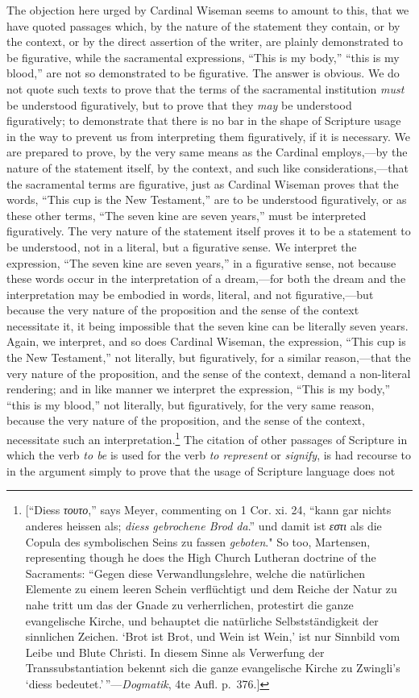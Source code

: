 \documentclass[english,]{book}
\begin{document}
The objection here urged by Cardinal Wiseman seems to amount to this, that we have quoted passages which, by the nature of the statement they contain, or by the context, or by the direct assertion of the writer, are plainly demonstrated to be figurative, while the sacramental expressions, ``This is my body,'' ``this is my blood,'' are not so demonstrated to be figurative. The answer is obvious. We do not quote such texts to prove that the terms of the sacramental institution \emph{must} be understood figuratively, but to prove that they \emph{may} be understood figuratively; to demonstrate that there is no bar in the shape of Scripture usage in the way to prevent us from interpreting them figuratively, if it is necessary. We are prepared to prove, by the very same means as the Cardinal employs,---by the nature of the statement itself, by the context, and such like considerations,---that the sacramental terms are figurative, just as Cardinal Wiseman proves that the words, ``This cup is the New Testament,'' are to be understood figuratively, or as these other terms, ``The seven kine are seven years,'' must be interpreted figuratively. The very nature of the statement itself proves it to be a statement to be understood, not in a literal, but a figurative sense. We interpret the expression, ``The seven kine are seven years,'' in a figurative sense, not because these words occur in the interpretation of a dream,---for both the dream and the interpretation may be embodied in words, literal, and not figurative,---but because the very nature of the proposition and the sense of the context necessitate it, it being impossible that the seven kine can be literally seven years. Again, we interpret, and so does Cardinal Wiseman, the expression, ``This cup is the New Testament,'' not literally, but figuratively, for a similar reason,---that the very nature of the proposition, and the sense of the context, demand a non-literal rendering; and in like manner we interpret the expression, ``This is my body,'' ``this is my blood,'' not literally, but figuratively, for the very same reason, because the very nature of the proposition, and the sense of the context, necessitate such an interpretation.\footnote{{[}``Diess \emph{τουτο},'' says Meyer, commenting on 1 Cor. xi. 24, ``kann gar nichts anderes heissen als; \emph{diess gebrochene Brod da}.'' und damit ist \emph{εστι} als die Copula des symbolischen Seins zu fassen \emph{geboten}." So too, Martensen, representing though he does the High Church Lutheran doctrine of the Sacraments: ``Gegen diese Verwandlungslehre, welche die natürlichen Elemente zu einem leeren Schein verflüchtigt und dem Reiche der Natur zu nahe tritt um das der Gnade zu verherrlichen, protestirt die ganze evangelische Kirche, und behauptet die natürliche Selbstständigkeit der sinnlichen Zeichen. `Brot ist Brot, und Wein ist Wein,' ist nur Sinnbild vom Leibe und Blute Christi. In diesem Sinne als Verwerfung der Transsubstantiation bekennt sich die ganze evangelische Kirche zu Zwingli's `diess bedeutet.'\,''---\emph{Dogmatik}, 4te Aufl. p.~376.{]}} The citation of other passages of Scripture in which the verb \emph{to be} is used for the verb \emph{to represent} or \emph{signify}, is had recourse to in the argument simply to prove that the usage of Scripture language does not 
\end{document}
